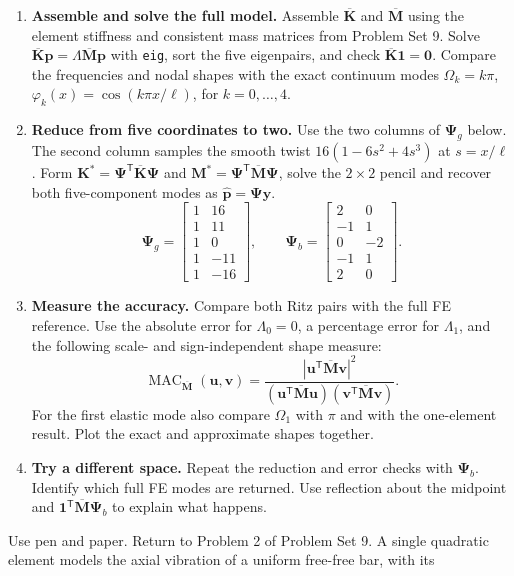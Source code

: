 \documentclass[12pt]{article}
\newcommand{\T}{^{\mathsf T}}
\newcommand{\bK}{\overline{\mathbf K}}
\newcommand{\bM}{\overline{\mathbf M}}
\newcommand{\vct}[1]{\mathbf{#1}}
\newcommand{\colv}[1]{\begin{bmatrix}#1\end{bmatrix}}
\begin{document}
\begin{enumerate}
  \item \textbf{Assemble and solve the full model.}
        Assemble $\bK$ and $\bM$ using the element stiffness and consistent mass
        matrices from Problem Set 9. Solve $\bK\vct p=\Lambda\bM\vct p$ with
        \texttt{eig}, sort the five eigenpairs, and check $\bK\vct 1=\vct 0$.
        Compare the frequencies and nodal shapes with the exact continuum modes
        $\Omega_k=k\pi$, $\varphi_k(x)=\cos(k\pi x/\ell)$, for $k=0,\ldots,4$.
  \item \textbf{Reduce from five coordinates to two.}
        Use the two columns of $\vct\Psi_g$ below. The second column samples the
        smooth twist $16(1-6s^2+4s^3)$ at $s=x/\ell$.
        Form $\vct K^*=\vct\Psi\T\bK\vct\Psi$ and
        $\vct M^*=\vct\Psi\T\bM\vct\Psi$, solve the $2\times2$ pencil and recover
        both five-component modes as $\widehat{\vct p}=\vct\Psi\vct y$.
        \[
          \vct\Psi_g=\colv{1&16\\1&11\\1&0\\1&-11\\1&-16},
          \qquad
          \vct\Psi_b=\colv{2&0\\-1&1\\0&-2\\-1&1\\2&0}.
        \]
  \item \textbf{Measure the accuracy.} Compare both Ritz pairs with the full
        FE reference. Use the absolute error for $\Lambda_0=0$, a percentage error
        for $\Lambda_1$, and the following scale- and sign-independent shape measure:
        \[
          \operatorname{MAC}_{\bM}(\vct u,\vct v)=
          \frac{|\vct u\T\bM\vct v|^2}{(\vct u\T\bM\vct u)(\vct v\T\bM\vct v)}.
        \]
        For the first elastic mode also compare $\widehat\Omega_1$ with $\pi$ and
        with the one-element result. Plot the exact and approximate shapes together.
  \item \textbf{Try a different space.} Repeat the reduction and error checks
        with $\vct\Psi_b$. Identify which full FE modes are returned. Use reflection
        about the midpoint and $\vct 1\T\bM\vct\Psi_b$ to explain what happens.
\end{enumerate}
\newpage
{}
Use pen and paper. Return to Problem 2 of Problem Set 9. A single quadratic
element models the axial vibration of a uniform free-free bar, with its
\end{document}
